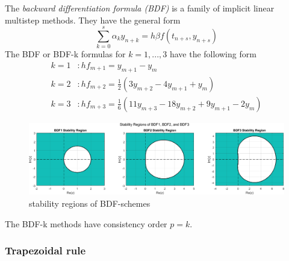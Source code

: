 	\begin{frame}
		The \emph{backward differentiation formula (BDF)} is a family of implicit linear multistep methods. They have the general form
		\begin{equation}
			\sum_{k=0}^{s} \alpha_k y_{n+k} = h \beta f(t_{n+s}, y_{n+s})
		\end{equation}
		The BDF or BDF-k formulas for $k=1,...,3$ have the following form %
		\begin{align*}
			k = 1 &: h f_{m+1} = y_{m+1} - y_m \\
			k = 2 &: h f_{m+2} = \frac{1}{2} (3 y_{m+2} - 4 y_{m+1} + y_m) \\
			k = 3 &: h f_{m+3} = \frac{1}{6} (11 y_{m+3} - 18 y_{m+2} + 9 y_{m+1} - 2 y_m) %
		\end{align*}
	\end{frame}
	
	\begin{frame}
		\begin{figure}[H]
			\centering
			\includegraphics[width=1\linewidth]{../Tex/pictures/bdf_stability_regions.png}
			\caption{stability regions of BDF-schemes}
			\label{fig:screenshot020}
		\end{figure}
		\begin{theorem}%
			The BDF-k methods have consistency order $p=k$.
		\end{theorem}
	\end{frame}
	
	\subsubsection{Trapezoidal rule}
	
